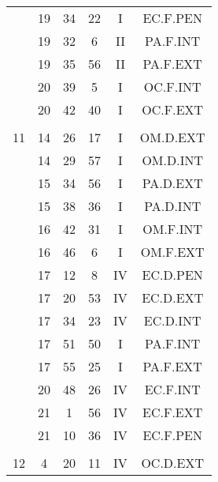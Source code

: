 \documentclass[12pt, a4paper]{article}
\begin{document}
\begin{multicols}{3}
{\begin{tabular}{c c c c c c}
	 	 	 	 & 19 & 34 & 22 & I & EC.F.PEN\\%
	 	 	 	 & 19 & 32 & 6 & II & PA.F.INT\\%
	 	 	 	 & 19 & 35 & 56 & II & PA.F.EXT\\%
	 	 	 	 & 20 & 39 & 5 & I & OC.F.INT\\%
	 	 	 	 & 20 & 42 & 40 & I & OC.F.EXT\\%
	 	 	 	 & & & & & \\%
	 	 	 	11 & 14 & 26 & 17 & I & OM.D.EXT\\%
	 	 	 	 & 14 & 29 & 57 & I & OM.D.INT\\%
	 	 	 	 & 15 & 34 & 56 & I & PA.D.EXT\\%
	 	 	 	 & 15 & 38 & 36 & I & PA.D.INT\\%
	 	 	 	 & 16 & 42 & 31 & I & OM.F.INT\\%
	 	 	 	 & 16 & 46 & 6 & I & OM.F.EXT\\%
	 	 	 	 & 17 & 12 & 8 & IV & EC.D.PEN\\%
	 	 	 	 & 17 & 20 & 53 & IV & EC.D.EXT\\%
	 	 	 	 & 17 & 34 & 23 & IV & EC.D.INT\\%
	 	 	 	 & 17 & 51 & 50 & I & PA.F.INT\\%
	 	 	 	 & 17 & 55 & 25 & I & PA.F.EXT\\%
	 	 	 	 & 20 & 48 & 26 & IV & EC.F.INT\\%
	 	 	 	 & 21 & 1 & 56 & IV & EC.F.EXT\\%
	 	 	 	 & 21 & 10 & 36 & IV & EC.F.PEN\\%
	 	 	 	 & & & & & \\%
	 	 	 	12 & 4 & 20 & 11 & IV & OC.D.EXT\\%
	 	 \end{tabular}
 	}
\end{multicols}
\end{document}
